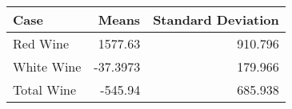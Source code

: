 \begin{tabular}{lrr}
\hline
 Case       &     Means &   Standard Deviation \\
\hline
 Red Wine   & 1577.63   &              910.796 \\
 White Wine &  -37.3973 &              179.966 \\
 Total Wine & -545.94   &              685.938 \\
\hline
\end{tabular}